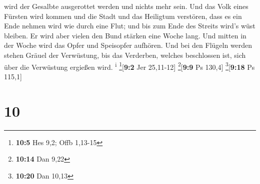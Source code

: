 wird der Gesalbte ausgerottet werden und nichts mehr sein. Und das Volk
eines Fürsten wird kommen und die Stadt und das Heiligtum verstören,
dass es ein Ende nehmen wird wie durch eine Flut; und bis zum Ende des
Streits wird's wüst bleiben.  Er wird aber vielen den
Bund stärken eine Woche lang. Und mitten in der Woche wird das Opfer und
Speisopfer aufhören. Und bei den Flügeln werden stehen Gräuel der
Verwüstung, bis das Verderben, welches beschlossen ist, sich über die
Verwüstung ergießen wird. \textsuperscript{i} \footnote{\textbf{10:5}
  Hes 9,2; Offb 1,13-15}{[}\textbf{9:2} Jer 25,11-12{]}
\footnote{\textbf{10:14} Dan 9,22}{[}\textbf{9:9} Ps 130,4{]}
\footnote{\textbf{10:20} Dan 10,13}{[}\textbf{9:18} Ps 115,1{]}

\hypertarget{section-9}{%
\section{10}\label{section-9}}


